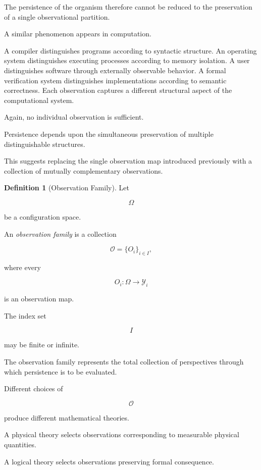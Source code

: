 \documentclass[11pt]{book}
\numberwithin{equation}{chapter}
\theoremstyle{definition}
\newtheorem{definition}{Definition}[chapter]
\theoremstyle{plain}
\begin{document}
The persistence of the organism therefore cannot be reduced to the preservation of a single observational partition.

A similar phenomenon appears in computation.

A compiler distinguishes programs according to syntactic structure. An operating system distinguishes executing processes according to memory isolation. A user distinguishes software through externally observable behavior. A formal verification system distinguishes implementations according to semantic correctness. Each observation captures a different structural aspect of the computational system.

Again, no individual observation is sufficient.

Persistence depends upon the simultaneous preservation of multiple distinguishable structures.

This suggests replacing the single observation map introduced previously with a collection of mutually complementary observations.

\begin{definition}[Observation Family]

Let

\[
\Omega
\]

be a configuration space.

An \emph{observation family} is a collection

\[
\mathcal{O}
=
\{O_i\}_{i\in I},
\]

where every

\[
O_i:\Omega\rightarrow\mathcal{Y}_i
\]

is an observation map.

The index set

\[
I
\]

may be finite or infinite.

\end{definition}

The observation family represents the total collection of perspectives through which persistence is to be evaluated.

Different choices of

\[
\mathcal{O}
\]

produce different mathematical theories.

A physical theory selects observations corresponding to measurable physical quantities.

A logical theory selects observations preserving formal consequence.
\end{document}
